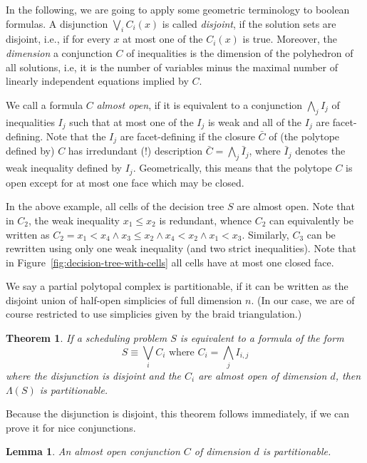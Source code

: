 \documentclass[12pt,reqno]{amsart}
\numberwithin{definition}{section}
\newtheorem{theorem}[definition]{Theorem}
\newtheorem{lemma}[definition]{Lemma}
\theoremstyle{definition}
\newcommand{\allow}{\Lambda} %
\begin{document}
In the following, we are going to apply some geometric terminology to boolean formulas. A disjunction $\bigvee_i C_i(x)$ is called \emph{disjoint}, if the solution sets are disjoint, i.e., if for every $x$ at most one of the $C_i(x)$ is true. Moreover, the \emph{dimension} a conjunction $C$ of inequalities is the dimension of the polyhedron of all solutions, i.e, it is the number of variables minus the maximal number of linearly independent equations implied by $C$.

We call a formula $C$ \emph{almost open}, if it is equivalent to a conjunction $\bigwedge_j I_{j}$ of inequalities $I_j$ such that at most one of the $I_j$ is weak and all of the $I_j$ are facet-defining. Note that the $I_j$ are facet-defining if the closure $\bar{C}$ of (the polytope defined by) $C$ has irredundant (!) description $\bar{C} = \bigwedge_j \bar{I}_j$, where $\bar{I}_j$ denotes the weak inequality defined by $I_j$. Geometrically, this means that the polytope $C$ is open except for at most one face which may be closed.

In the above example, all cells of the decision tree $S$ are almost open. Note that in $C_2$, the weak inequality $x_1 \leq x_2$ is redundant, whence $C_2$ can equivalently be written as $C_2 = x_1 < x_4 \wedge x_3 \leq x_2 \wedge x_4 < x_2 \wedge x_1 < x_3$. Similarly, $C_3$ can be rewritten using only one weak inequality (and two strict inequalities). Note that in Figure~\ref{fig:decision-tree-with-cells} all cells have at most one closed face.

We say a partial polytopal complex is partitionable, if it can be written as the disjoint union of half-open simplicies of full dimension $n$. (In our case, we are of course restricted to use simplicies given by the braid triangulation.)

\begin{theorem}
If a scheduling problem $S$ is equivalent to a formula of the form
\[
  S \equiv \bigvee_i C_i \text{ where } C_i = \bigwedge_j I_{i,j}
\]
where the disjunction is disjoint and the $C_i$ are almost open of dimension $d$, then $\allow(S)$ is partitionable.
\end{theorem}

Because the disjunction is disjoint, this theorem follows immediately, if we can prove it for nice conjunctions.

\begin{lemma}
\label{lem:almost-open}
An almost open conjunction $C$ of dimension $d$ is partitionable.
\end{lemma}
\end{document}
